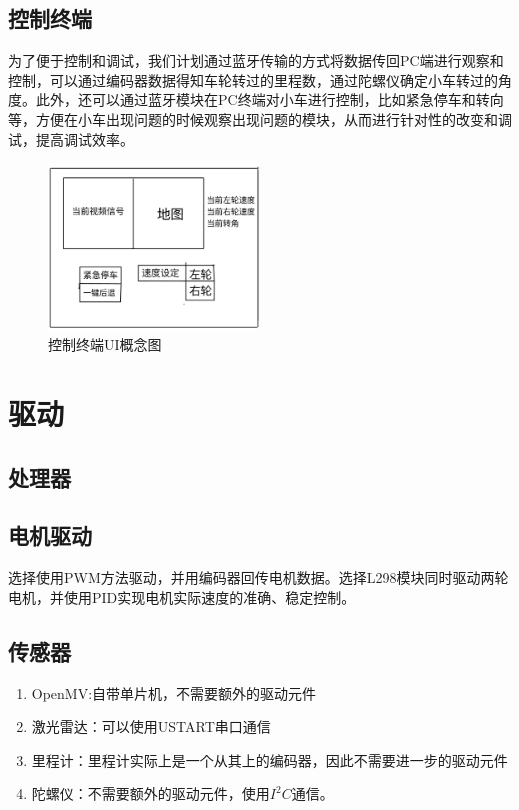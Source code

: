 \documentclass{report}
\begin{document}
\subsection{控制终端}
\label{subsec:label}
为了便于控制和调试，我们计划通过蓝牙传输的方式将数据传回PC端进行观察和控制，可以通过编码器数据得知车轮转过的里程数，通过陀螺仪确定小车转过的角度。此外，还可以通过蓝牙模块在PC终端对小车进行控制，比如紧急停车和转向等，方便在小车出现问题的时候观察出现问题的模块，从而进行针对性的改变和调试，提高调试效率。
\begin{figure}[ht]
  \centering
  \includegraphics[width=0.5\textwidth]{figures/ui.jpg}
  \caption{控制终端UI概念图 }
\end{figure}


\section{驱动}
\label{sec:label}
\subsection{处理器}
\label{subsec:label}
\subsection{电机驱动}
\label{subsec:label}
选择使用PWM方法驱动，并用编码器回传电机数据。选择L298模块同时驱动两轮电机，并使用PID实现电机实际速度的准确、稳定控制。
\subsection{传感器}
\label{subsec:label}
\begin{enumerate}
\item OpenMV:自带单片机，不需要额外的驱动元件
\item 激光雷达：可以使用USTART串口通信
\item 里程计：里程计实际上是一个从其上的编码器，因此不需要进一步的驱动元件
  \item 陀螺仪：不需要额外的驱动元件，使用$I^{2}C$通信。

  \end{enumerate}
  \newpage
\end{document}
